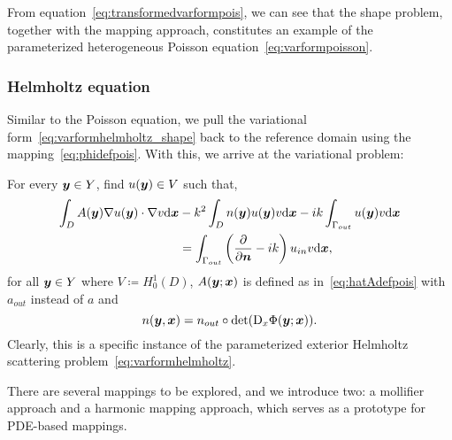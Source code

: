 From equation~\eqref{eq:transformedvarformpois}, we can see that the shape problem, together with the mapping approach, constitutes an example of the parameterized heterogeneous Poisson equation~\eqref{eq:varformpoisson}.


\subsubsection{Helmholtz equation}\label{subsubsec:helmholtz-mapping}
Similar to the Poisson equation, we pull the variational form~\eqref{eq:varformhelmholtz_shape} back to the reference domain using the mapping~\eqref{eq:phidefpois}.
With this, we arrive at the variational problem:

For every ${\bm{y}}\in Y$, find $u({\bm{y}}) \in V$ such that,
\begin{align}
    \int_D A({\bm{y}}) \nabla u({\bm{y}}) \cdot \nabla v \mathrm{d}{{\bm{x}}} &-k^2\int_D n({\bm{y}})  u({\bm{y}}) v \mathrm{d}{{\bm{x}}} -ik\int_{\Gamma_{out}} u({\bm{y}}) v \mathrm{d}{{\bm{x}}} \nonumber\\
    &= \int_{\Gamma_{out}} \left( \frac{\partial}{\partial\bm{n}} -ik\right) u_{in} v \mathrm{d}{{\bm{x}}},\label{eq:varformhelmholtzshape}
\end{align}
for all ${\bm{y}}\in Y$ where $V\coloneqq H_0^1(D)$, $A({\bm{y}}; {{\bm{x}}})$ is defined as in~\eqref{eq:hatAdefpois} with $a_{out}$ instead of $a$ and
\begin{equation*}
    n({\bm{y}}, {{\bm{x}}}) = n_{out}\circ\det(\mathop{}\!\mathrm{D}_x\Phi({\bm{y}}; {{\bm{x}}})).
\end{equation*}
Clearly, this is a specific instance of the parameterized exterior Helmholtz scattering problem~\eqref{eq:varformhelmholtz}.

There are several mappings to be explored, and we introduce two: a mollifier approach and a harmonic mapping approach, which serves as a prototype for PDE-based mappings.
